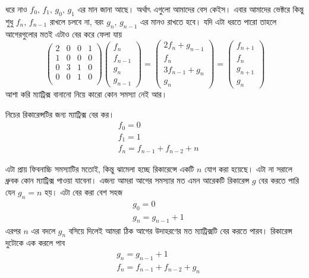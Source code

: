 \noindent ধরে নাও $f_{0}, \, f_{1}, \, g_{0}, \, g_{1}$ এর মান জানা আছে। অর্থাৎ এগুলো আমাদের বেস কেইস। এবার আমাদের ভেক্টরে কিন্তু শুধু $f_{n}, \, f_{n - 1}$ রাখলে চলবে না, বরং $g_{n}, \, g_{n - 1}$ এর মানও রাখতে হবে। যদি এটা ধরতে পারো তাহলে আগেরগুলোর মতই এটাও বের করে ফেলা যায়
$$
\begin{pmatrix}
2 & 0 & 0 & 1 \\
1 & 0 & 0 & 0 \\
0 & 3 & 1 & 0 \\
0 & 0 & 1 & 0 \\
\end{pmatrix}
\begin{pmatrix}
f_{n} \\
f_{n - 1} \\
g_{n} \\
g_{n - 1}
\end{pmatrix}
=
\begin{pmatrix}
2f_{n} + g_{n - 1}\\
f_{n} \\
3f_{n - 1} + g_{n} \\
g_{n}
\end{pmatrix}
=
\begin{pmatrix}
f_{n + 1} \\
f_{n} \\
g_{n + 1} \\
g_{n}
\end{pmatrix}
$$
আশা করি ম্যাট্রিক্স বানানো নিয়ে কারো কোন সমস্যা নেই আর।

\begin{problem}
নিচের রিকারেন্সটির জন্য ম্যাট্রিক্স বের কর।
\begin{align*}
& f_{0} = 0 \\
& f_{1} = 1 \\
& f_{n} = f_{n - 1} + f_{n - 2} + n
\end{align*}
\end{problem}
\begin{solution}
এটা প্রায় ফিবনাচ্চি সমস্যাটির মতোই, কিন্তু ঝামেলা হচ্ছে রিকারেন্সে একটি $n$ যোগ করা হয়েছে। এটা না সরালে ধ্রুবক কোন ম্যাট্রিক্স পাওয়া যাবেনা। এজন্য আমরা আগের সমস্যার মত এমন আরেকটি রিকারেন্স $g$ বের করতে পারি যেন $g_{n} = n$ হয়। এটা বের করা বেশ সহজ
\begin{align*}
& g_{0} = 0 \\
& g_{n} = g_{n - 1} + 1
\end{align*}
এরপর $n$ এর বদলে $g_{n}$ বসিয়ে দিলেই আমরা ঠিক আগের উদাহরণের মত ম্যাট্রিক্সটি বের করতে পারব। রিকারেন্স দুটোকে এক করলে পাব
\begin{align*}
& g_{n} = g_{n - 1} + 1 \\
& f_{n} = f_{n - 1} + f_{n - 2} + g_{n}
\end{align*}
\end{solution}

